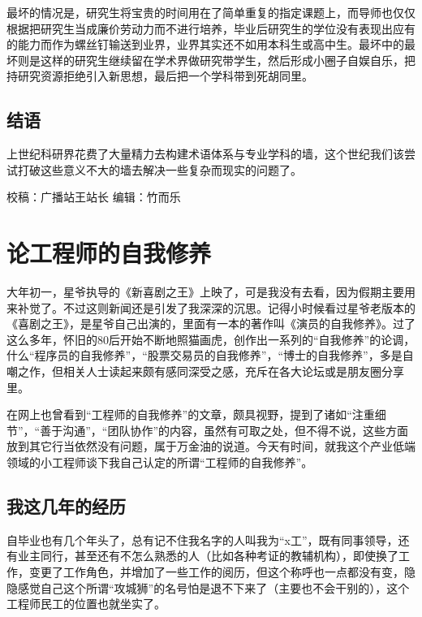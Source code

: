 \documentclass[]{book}
\begin{document}
最坏的情况是，研究生将宝贵的时间用在了简单重复的指定课题上，而导师也仅仅根据把研究生当成廉价劳动力而不进行培养，毕业后研究生的学位没有表现出应有的能力而作为螺丝钉输送到业界，业界其实还不如用本科生或高中生。最坏中的最坏则是这样的研究生继续留在学术界做研究带学生，然后形成小圈子自娱自乐，把持研究资源拒绝引入新思想，最后把一个学科带到死胡同里。

\hypertarget{ux7ed3ux8bed-18}{%
\subsection{结语}\label{ux7ed3ux8bed-18}}

上世纪科研界花费了大量精力去构建术语体系与专业学科的墙，这个世纪我们该尝试打破这些意义不大的墙去解决一些复杂而现实的问题了。

校稿：广播站王站长
编辑：竹而乐

\hypertarget{ux8bbaux5de5ux7a0bux5e08ux7684ux81eaux6211ux4feeux517b}{%
\section{论工程师的自我修养}\label{ux8bbaux5de5ux7a0bux5e08ux7684ux81eaux6211ux4feeux517b}}

大年初一，星爷执导的《新喜剧之王》上映了，可是我没有去看，因为假期主要用来补觉了。不过这则新闻还是引发了我深深的沉思。记得小时候看过星爷老版本的《喜剧之王》，是星爷自己出演的，里面有一本的著作叫《演员的自我修养》。过了这么多年，怀旧的80后开始不断地照猫画虎，创作出一系列的``自我修养''的论调，什么``程序员的自我修养''，``股票交易员的自我修养''，``博士的自我修养''，多是自嘲之作，但相关人士读起来颇有感同深受之感，充斥在各大论坛或是朋友圈分享里。

在网上也曾看到``工程师的自我修养''的文章，颇具视野，提到了诸如``注重细节''，``善于沟通''，``团队协作''的内容，虽然有可取之处，但不得不说，这些方面放到其它行当依然没有问题，属于万金油的说道。今天有时间，就我这个产业低端领域的小工程师谈下我自己认定的所谓``工程师的自我修养''。

\hypertarget{ux6211ux8fd9ux51e0ux5e74ux7684ux7ecfux5386}{%
\subsection{我这几年的经历}\label{ux6211ux8fd9ux51e0ux5e74ux7684ux7ecfux5386}}

自毕业也有几个年头了，总有记不住我名字的人叫我为``x工''，既有同事领导，还有业主同行，甚至还有不怎么熟悉的人（比如各种考证的教辅机构），即使换了工作，变更了工作角色，并增加了一些工作的阅历，但这个称呼也一点都没有变，隐隐感觉自己这个所谓``攻城狮''的名号怕是退不下来了（主要也不会干别的），这个工程师民工的位置也就坐实了。
\end{document}
